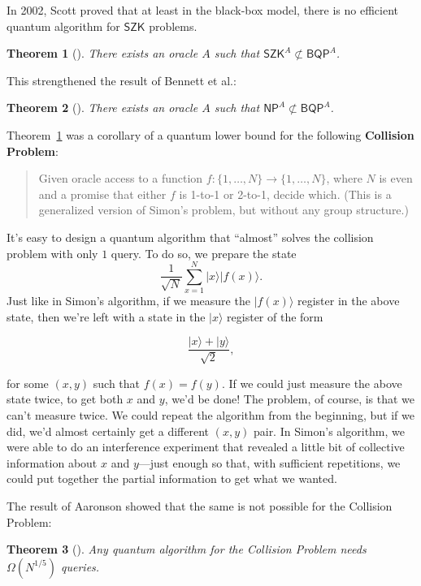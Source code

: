 \documentclass[12pt]{report}
\theoremstyle{plain}
\newtheorem{theorem}{Theorem}[section]
\theoremstyle{definition}
\renewcommand{\ket}[1]{|#1\rangle}
\begin{document}
In 2002, Scott proved that at least in the black-box model, there is no efficient quantum algorithm for $\mathsf{SZK}$ problems.

\begin{theorem}[\cite{aar:col}]\label{A03}
There exists an oracle $A$ such that $\mathsf{SZK}^A \not\subset \mathsf{BQP}^A$.
\end{theorem}

This strengthened the result of Bennett et al.:
\begin{theorem}[\cite{DBLP:journals/siamcomp/BennettBBV97}]
There exists an oracle $A$ such that $\mathsf{NP}^A \not\subset \mathsf{BQP}^A$.
\end{theorem}

Theorem~\ref{A03} was a corollary of a quantum lower bound for the following \textbf{Collision Problem}:
\begin{quote}
Given oracle access to a function  $f\colon \{1,\dots, N\} \to \{1,\dots, N\}$,  where $N$ is even and a promise that either $f$ is 1-to-1 or 2-to-1, decide which. (This is a generalized version of Simon's problem, but without any group structure.)
\end{quote}

It's easy to design a quantum algorithm that ``almost'' solves the collision problem with only $1$ query.  To do so, we prepare the state
\[
\frac{1}{\sqrt{N}} \sum_{x=1}^N \ket{x} \ket{f(x)}.
\]
Just like in Simon's algorithm, if we measure the $\ket{f(x)}$ register in the above state, then we're left with a state in the $\ket{x}$ register of the form

$$\frac{\ket{x} + \ket{y}}{\sqrt{2}},$$

\noindent for some $(x,y)$ such that $f(x)=f(y)$.  If we could just measure the above state twice, to get both $x$ and $y$, we'd be done!  The problem, of course, is that we can't measure twice.  We could repeat the algorithm from the beginning, but if we did, we'd almost certainly get a different $(x,y)$ pair.  In Simon's algorithm, we were able to do an interference experiment that revealed a little bit of collective information about $x$ and $y$---just enough so that, with sufficient repetitions, we could put together the partial information to get what we wanted.

The result of Aaronson \cite{aar:col} showed that the same is not possible for the Collision Problem:

\begin{theorem}[\cite{aar:col}]
\label{colthm}
Any quantum algorithm for the Collision Problem needs $\Omega(N^{1/5})$ queries.
\end{theorem}
\end{document}
